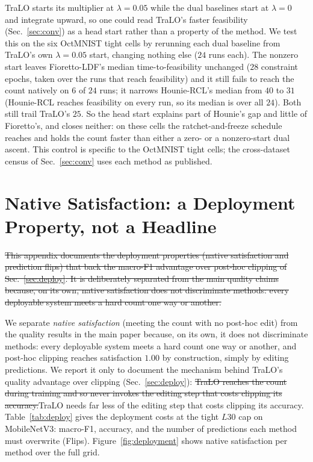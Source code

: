 \documentclass[10pt]{article}
\newcommand{\del}[1]{{\color{red}\sout{#1}}}
\begin{document}
TraLO starts its multiplier at $\lambda{=}0.05$ while the dual
baselines start at $\lambda{=}0$ and integrate upward, so one could
read TraLO's faster feasibility (Sec.~\ref{sec:conv}) as a head start
rather than a property of the method. We test this on the six OctMNIST
tight cells by rerunning each dual baseline from TraLO's own
$\lambda{=}0.05$ start, changing nothing else ($24$ runs each). The
nonzero start leaves Fioretto-LDF's median time-to-feasibility
unchanged ($28$ constraint epochs, taken over the runs that reach
feasibility) and it still fails to reach the count natively on $6$ of
$24$ runs; it narrows Hounie-RCL's median from $40$ to $31$
(Hounie-RCL reaches feasibility on every run, so its median is over
all $24$). Both still trail TraLO's $25$. So the head start explains
part of Hounie's gap and little of Fioretto's, and closes neither: on
these cells the ratchet-and-freeze schedule reaches and holds the
count faster than either a zero- or a nonzero-start dual ascent. This
control is specific to the OctMNIST tight cells; the cross-dataset
census of Sec.~\ref{sec:conv} uses each method as published.



\section{Native Satisfaction: a Deployment Property, not a Headline}
\label{app:deploy}

\del{This appendix documents the deployment properties (native satisfaction
and prediction flips) that back the macro-F1 advantage over post-hoc
clipping of Sec.~\ref{sec:deploy}. It is deliberately separated from the
main quality claims because, on its own, native satisfaction does not
discriminate methods: every deployable system meets a hard count one
way or another.}



We separate \emph{native satisfaction} (meeting the count with no
post-hoc edit) from the quality results in the main paper because, on
its own, it does not discriminate methods: every deployable system meets
a hard count one way or another, and post-hoc clipping reaches
satisfaction $1.00$ by construction, simply by editing predictions. We
report it only to document the mechanism behind TraLO's quality
advantage over clipping (Sec.~\ref{sec:deploy}): \del{TraLO reaches the
count during training and so never invokes the editing step that costs
clipping its accuracy.}{\color{blue}TraLO needs far less of the editing
step that costs clipping its accuracy.} Table~\ref{tab:deploy} gives the deployment costs
at the tight $L30$ cap on MobileNetV3: macro-F1, accuracy, and the
number of predictions each method must overwrite (Flips).
Figure~\ref{fig:deployment} shows native satisfaction per method over
the full grid.
\end{document}

